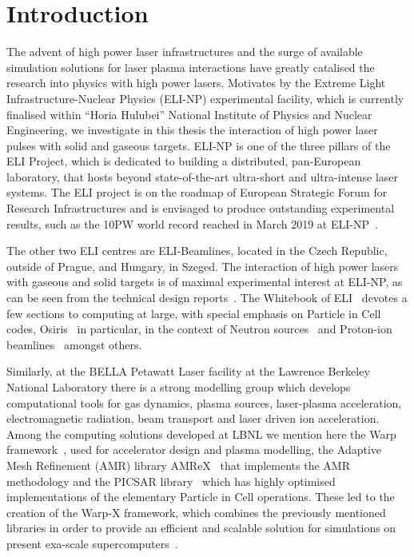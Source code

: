 \documentclass[12pt, class=report, crop=false]{standalone}
\begin{document}
\chapter{Introduction}%
\label{chap:intro}

The advent of high power laser infrastructures and the surge of available
simulation solutions for laser plasma interactions have greatly catalised
the research into physics with high power lasers. Motivates by the
Extreme Light Infrastructure-Nuclear Physics (ELI-NP) experimental facility,
which is currently finalised within ``Horia Hulubei'' National Institute of Physics and Nuclear Engineering, we investigate in this thesis the interaction of high power
laser pulses with solid and gaseous targets.
ELI-NP is one of the three pillars of the ELI Project, which is dedicated to
building a distributed, pan-European laboratory, that hosts beyond state-of-the-art
ultra-short and ultra-intense laser systems. The ELI project is on the roadmap
of European Strategic Forum for Research Infrastructures and is envisaged to produce
outstanding experimental results, such as the 10PW world record reached in March 2019
at ELI-NP~\autocite{eli-npteam_pressrelease_2019}.

The other two ELI centres are ELI-Beamlines, located in the Czech Republic, outside of Prague,
and Hungary, in Szeged.
The interaction of high power lasers with gaseous and solid targets is
of maximal experimental interest at ELI-NP, as can be seen from the
technical design reports~\autocite{gales_introduction_2016}.
The Whitebook of ELI~\autocite{mourou_eliextreme_2011} devotes a few sections
to computing at large, with special emphasis on Particle in Cell codes,
Osiris~\autocite{fonseca_osiristhreedimensional_2002} in particular,
in the context of Neutron sources~\autocite[79]{mourou_eliextreme_2011} and Proton-ion beamlines~\autocite[323]{mourou_eliextreme_2011} amongst others.

Similarly, at the BELLA Petawatt Laser facility at the Lawrence Berkeley National Laboratory
there is a strong
modelling group which develops computational tools for gas dynamics, plasma sources,
laser-plasma acceleration, electromagnetic radiation, beam transport and
laser driven ion acceleration. Among the computing solutions developed at LBNL
we mention here the Warp framework~\autocite{grote_warpcode_2005}, used for
accelerator design and plasma modelling, the Adaptive Mesh Refinement (AMR) library
AMReX~\autocite{zhang_amrexframework_2019} that implements the AMR methodology
and the PICSAR library~\autocite{vincenti_efficientportable_2017} which has
highly optimised implementations of the elementary Particle in Cell operations.
These led to the creation of the Warp-X framework, which combines the previously
mentioned libraries in order to provide an efficient and scalable solution for
simulations on present exa-scale supercomputers~\autocite{vay_warpxnew_2018}.
\end{document}
